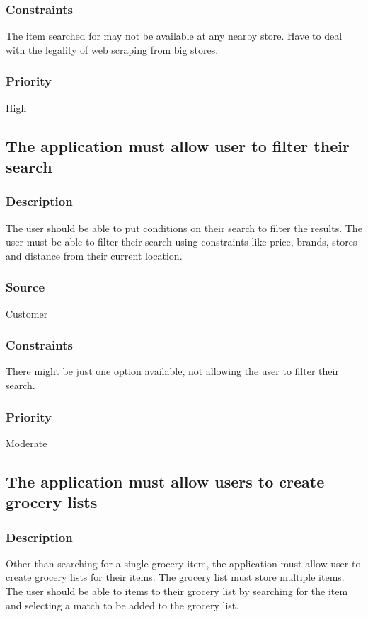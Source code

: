 \subsubsection{Constraints}
The item searched for may not be available at any nearby store. Have to deal with the legality of web scraping from big stores.
\subsubsection{Priority}
High\\

\subsection{The application must allow user to filter their search}
\subsubsection{Description}
The user should be able to put conditions on their search to filter the results. The user must be able to filter their search using constraints like price, brands, stores and distance from their current location.
\subsubsection{Source}
Customer
\subsubsection{Constraints}
There might be just one option available, not allowing the user to filter their search.
\subsubsection{Priority}
Moderate\\

\subsection{The application must allow users to create grocery lists}
\subsubsection{Description}
Other than searching for a single grocery item, the application must allow user to create grocery lists for their items. The grocery list must store multiple items. The user should be able to items to their grocery list by searching for the item and selecting a match to be added to the grocery list.

